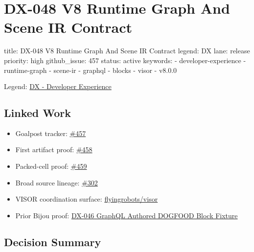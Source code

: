 \chapter{DX-048 V8 Runtime Graph And Scene IR Contract}\label{record-144}

\smallskip

\begin{RecordMeta}
title: DX-048 V8 Runtime Graph And Scene IR Contract
legend: DX
lane: release
priority: high
github_issue: 457
status: active
keywords:
  - developer-experience
  - runtime-graph
  - scene-ir
  - graphql
  - blocks
  - visor
  - v8.0.0

\end{RecordMeta}

Legend: \href{https://github.com/flyingrobots/bijou/blob/1853ad902f6bf219326409e7f743a5a1d6517dbc/docs/legends/DX-developer-experience.md}{DX - Developer Experience}

\section{Linked Work}\label{record-144-linked-work}

\begin{itemize}
\tightlist
\item
  Goalpost tracker: \href{https://github.com/flyingrobots/bijou/issues/457}{\#457}
\item
  First artifact proof: \href{https://github.com/flyingrobots/bijou/issues/458}{\#458}
\item
  Packed-cell proof: \href{https://github.com/flyingrobots/bijou/issues/459}{\#459}
\item
  Broad source lineage: \href{https://github.com/flyingrobots/bijou/issues/302}{\#302}
\item
  VISOR coordination surface: \href{https://github.com/flyingrobots/visor}{flyingrobots/visor}
\item
  Prior Bijou proof: \href{https://github.com/flyingrobots/bijou/blob/cbd70612140e7a450d764b3c7be1c6af878b99bc/docs/design/DX-046-graphql-authored-dogfood-block-fixture.md}{DX-046 GraphQL Authored DOGFOOD Block Fixture}
\end{itemize}

\section{Decision Summary}\label{record-144-decision-summary}

